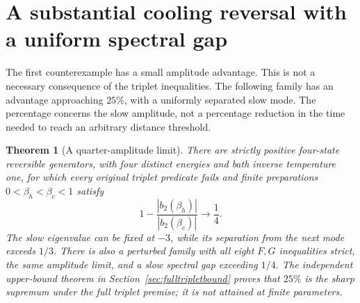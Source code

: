 \documentclass[11pt]{article}
\newtheorem{theorem}{Theorem}
\begin{document}
\section{A substantial cooling reversal with a uniform spectral gap}\label{sec:quarterlimit}
The first counterexample has a small amplitude advantage. This is not a
necessary consequence of the triplet inequalities. The following family has
an advantage approaching $25\%$, with a uniformly separated slow mode.
The percentage concerns the slow amplitude, not a percentage reduction in
the time needed to reach an arbitrary distance threshold.

\begin{theorem}[A quarter-amplitude limit]\label{thm:quarterlimit}
There are strictly positive four-state reversible generators, with four
distinct energies and bath inverse temperature one, for which every original
triplet predicate fails and finite preparations $0<\beta_h<\beta_c<1$ satisfy
\[
1-\frac{|b_2(\beta_h)|}{|b_2(\beta_c)|}\longrightarrow\frac14.
\]
The slow eigenvalue can be fixed at $-3$, while its separation from the next
mode exceeds $1/3$. There is also a perturbed family with all eight $F,G$
inequalities strict, the same amplitude limit, and a slow spectral gap
exceeding $1/4$. The independent upper-bound theorem in
Section~\ref{sec:fulltripletbound} proves that $25\%$ is the sharp supremum
under the full triplet premise; it is not attained at finite parameters.
\end{theorem}
\end{document}
